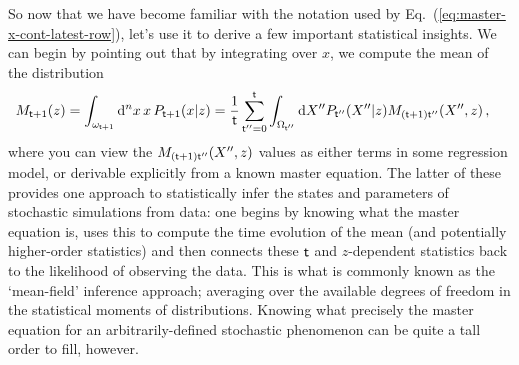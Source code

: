 So now that we have become familiar with the notation used by Eq.~(\ref{eq:master-x-cont-latest-row}), let's use it to derive a few important statistical insights. We can begin by pointing out that by integrating over $x$, we compute the mean of the distribution
\begin{align}
M_{{\sf t}+1}(z) &= \int_{\omega_{{\sf t}+1}}{\rm d}^nx \,x\, P_{{\sf t}+1}(x\vert z) = \frac{1}{{\sf t}}\sum_{{\sf t}''=0}^{{\sf t}} \int_{\Omega_{{\sf t}''}}{\rm d}X'' P_{{\sf t}''}(X''\vert z) M_{({\sf t}+1){\sf t}''}(X'',z) \,,
\end{align}
where you can view the $M_{({\sf t}+1){\sf t}''}(X'',z)$ values as either terms in some regression model, or derivable explicitly from a known master equation. The latter of these provides one approach to statistically infer the states and parameters of stochastic simulations from data: one begins by knowing what the master equation is, uses this to compute the time evolution of the mean (and potentially higher-order statistics) and then connects these ${\sf t}$ and $z$-dependent statistics back to the likelihood of observing the data. This is what is commonly known as the `mean-field' inference approach; averaging over the available degrees of freedom in the statistical moments of distributions. Knowing what precisely the master equation for an arbitrarily-defined stochastic phenomenon can be quite a tall order to fill, however. 

